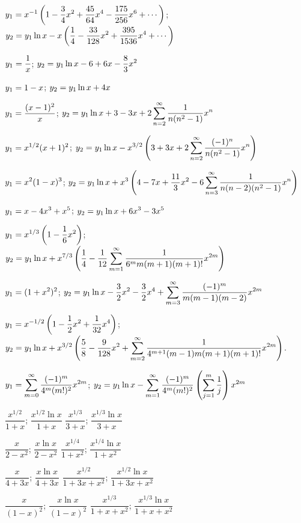 $\displaystyle{y_1=x^{-1}\left(1-\frac{3}{4}x^2+\frac{45}{64}x^4-\frac{175}{256}x^6+\cdots
\right)}$;\;
$\displaystyle{y_2=y_1\ln x-x\left(\frac{1}{4}-\frac{33}{128}x^2+\frac{395}{1536}x^4
+\cdots\right)}$

$\displaystyle{y_1=\frac{1}{x}}$;\;   $\displaystyle{y_2=y_1\ln x-6+6x-\frac{8}{3}x^2}$

$\displaystyle{y_1=1-x}$;\;   $\displaystyle{y_2=y_1\ln x+4x}$

$\displaystyle{y_1=\frac{(x-1)^2}{x}}$;\;   $\displaystyle{y_2=y_1\ln x+3-3x+2\sum_{n=2}^\infty
\frac{1}{n(n^2-1)}x^n}$

$\displaystyle{y_1=x^{1/2}(x+1)^2}$;\;   $\displaystyle{y_2=y_1\ln x-x^{3/2}\left(
3+3x+2\sum_{n=2}^\infty\frac{(-1)^n}{n(n^2-1)}x^n\right)}$

$\displaystyle{y_1=x^2(1-x)^3}$;\;   $\displaystyle{y_2=y_1\ln
x+x^3\left(4-7x+\frac{11}{3}x^2-6\sum_{n=3}^\infty\frac{1}{n(n-2)(n^2-1)}x^n\right)}$

$\displaystyle{y_1=x-4x^3+x^5}$;\;   $\displaystyle{y_2=y_1\ln x+6x^3-3x^5}$

$\displaystyle{y_1=x^{1/3}\left(1-\frac{1}{6}x^2\right)}$;\;
 $\displaystyle{y_2=y_1\ln x
+x^{7/3}\left(\frac{1}{4}-\frac{1}{12}\sum_{m=1}^\infty
\frac{1}{6^mm(m+1)(m+1)!}x^{2m}\right)}$

$\displaystyle{y_1=(1+x^2)^2}$;\;   $\displaystyle{y_2=y_1\ln x-\frac{3}{2}x^2-\frac{3}{2}x^4
+\sum_{m=3}^\infty\frac{(-1)^m}{m(m-1)(m-2)}x^{2m}}$

$\displaystyle{y_1=x^{-1/2}\left(1-\frac{1}{2}x^2+\frac{1}{32}x^4\right)}$;\;
$\displaystyle{y_2=y_1\ln x+x^{3/2}\left(\frac{5}{8}-\frac{9}{128}x^2
+\sum_{m=2}^\infty\frac{1}{4^{m+1}(m-1)m(m+1)(m+1)!}x^{2m}\right)}$.

$\displaystyle{y_1=\sum_{m=0}^\infty\frac{(-1)^m}{4^m(m!)^2}x^{2m}}$;\;
$\displaystyle{y_2=y_1\ln x-\sum_{m=1}^\infty\frac{(-1)^m}{4^m(m!)^2}\left(\sum_{j=1}^m\frac{1}{j}\right)x^{2m}}$

 $\dfrac{x^{1/2}}{1+x}$;\;   $\dfrac{x^{1/2}\ln x}{1+x}$
 $\dfrac{x^{1/3}}{3+x}$;\;   $\dfrac{x^{1/3}\ln x}{3+x}$

 $\dfrac{x}{2-x^2}$;\;   $\dfrac{x\ln x}{2-x^2}$
 $\dfrac{x^{1/4}}{1+x^2}$;\;   $\dfrac{x^{1/4}\ln x}{1+x^2}$

 $\dfrac{x}{4+3x}$;\;   $\dfrac{x\ln x}{4+3x}$
 $\dfrac{x^{1/2}}{1+3x+x^2}$;\;   $\dfrac{x^{1/2}\ln x}{1+3x+x^2}$

 $\dfrac{x}{(1-x)^2}$;\;   $\dfrac{x\ln x}{(1-x)^2}$
 $\dfrac{x^{1/3}}{1+x+x^2}$;\;   $\dfrac{x^{1/3}\ln x}{1+x+x^2}$


